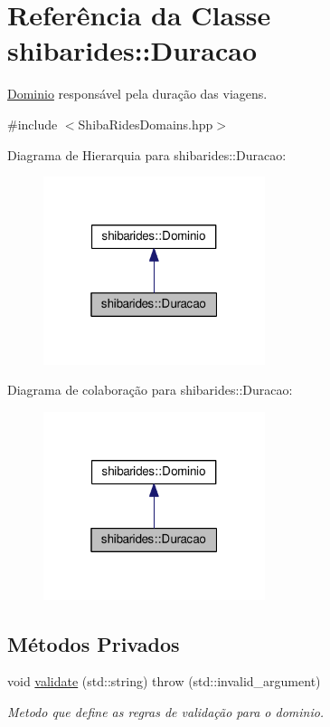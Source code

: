 \hypertarget{classshibarides_1_1Duracao}{}\section{Referência da Classe shibarides\+:\+:Duracao}
\label{classshibarides_1_1Duracao}


\hyperlink{classshibarides_1_1Dominio}{Dominio} responsável pela duração das viagens.  




{\ttfamily \#include $<$Shiba\+Rides\+Domains.\+hpp$>$}



Diagrama de Hierarquia para shibarides\+:\+:Duracao\+:\nopagebreak
\begin{figure}[H]
\begin{center}
\leavevmode
\includegraphics[width=184pt]{classshibarides_1_1Duracao__inherit__graph}
\end{center}
\end{figure}


Diagrama de colaboração para shibarides\+:\+:Duracao\+:\nopagebreak
\begin{figure}[H]
\begin{center}
\leavevmode
\includegraphics[width=184pt]{classshibarides_1_1Duracao__coll__graph}
\end{center}
\end{figure}
\subsection*{Métodos Privados}
\begin{DoxyCompactItemize}
\item 
void \hyperlink{classshibarides_1_1Duracao_aa64196edbfe284120c3d498e20212a99}{validate} (std\+::string)  throw (std\+::invalid\+\_\+argument)
\begin{DoxyCompactList}\small\item\em Metodo que define as regras de validação para o dominio. \end{DoxyCompactList}\end{DoxyCompactItemize}
